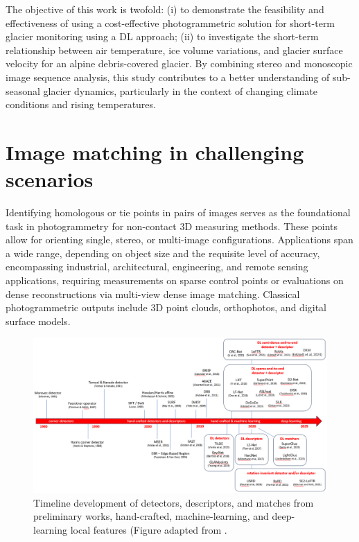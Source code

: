 The objective of this work is twofold:
(i) to demonstrate the feasibility and effectiveness of using a cost-effective
photogrammetric solution for short-term glacier monitoring using a DL approach;
(ii) to investigate the short-term relationship between air temperature, ice volume variations, and glacier surface velocity for an alpine debris-covered glacier.
By combining stereo and monoscopic image sequence analysis, this study
contributes to a better understanding of sub-seasonal glacier dynamics,
particularly in the context of changing climate conditions and rising temperatures.


\section{Image matching in challenging scenarios}\label{sec:4:localfeatures}

Identifying homologous or tie points in pairs of images serves as the foundational task in photogrammetry for non-contact 3D measuring methods. 
These points allow for orienting single, stereo, or multi-image configurations. Applications span a wide range, depending on object size and the requisite level of accuracy, encompassing industrial, architectural, engineering, and remote sensing applications, requiring measurements on sparse control points or evaluations on dense reconstructions via multi-view dense image matching. 
Classical photogrammetric outputs include 3D point clouds, orthophotos, and digital surface models. 

\begin{figure}
    \centering
    \includegraphics[width=1\textwidth]{local_feats_history}    
    \caption{Timeline development of detectors, descriptors, and matches from preliminary works, hand-crafted, machine-learning, and deep-learning local features (Figure adapted from \citet{remondino2022_at_with_dl}.}
    \label{fig:4:feats_history}
\end{figure}

